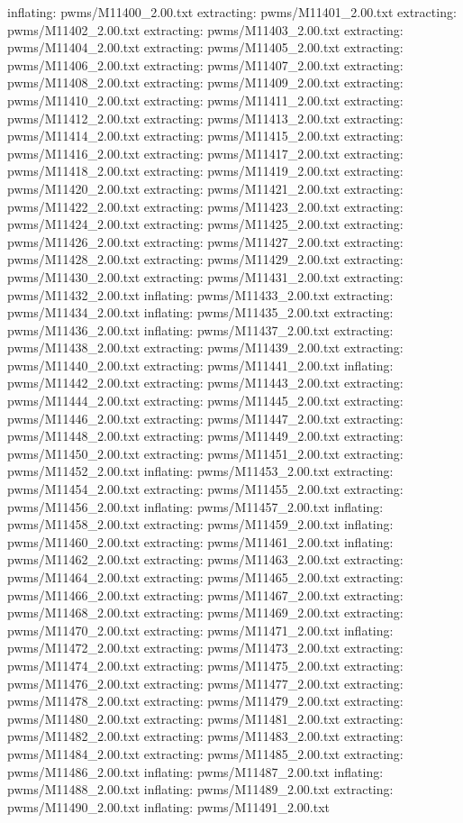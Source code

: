 \documentclass[letterpaper,10pt,english]{sphinxmanual}
\begin{document}
{\begin{sphinxVerbatim}[commandchars=\\\{\}]
  inflating: pwms/M11400\_2.00.txt
 extracting: pwms/M11401\_2.00.txt
 extracting: pwms/M11402\_2.00.txt
 extracting: pwms/M11403\_2.00.txt
 extracting: pwms/M11404\_2.00.txt
 extracting: pwms/M11405\_2.00.txt
 extracting: pwms/M11406\_2.00.txt
 extracting: pwms/M11407\_2.00.txt
 extracting: pwms/M11408\_2.00.txt
 extracting: pwms/M11409\_2.00.txt
 extracting: pwms/M11410\_2.00.txt
 extracting: pwms/M11411\_2.00.txt
 extracting: pwms/M11412\_2.00.txt
 extracting: pwms/M11413\_2.00.txt
 extracting: pwms/M11414\_2.00.txt
 extracting: pwms/M11415\_2.00.txt
 extracting: pwms/M11416\_2.00.txt
 extracting: pwms/M11417\_2.00.txt
 extracting: pwms/M11418\_2.00.txt
 extracting: pwms/M11419\_2.00.txt
 extracting: pwms/M11420\_2.00.txt
 extracting: pwms/M11421\_2.00.txt
 extracting: pwms/M11422\_2.00.txt
 extracting: pwms/M11423\_2.00.txt
 extracting: pwms/M11424\_2.00.txt
 extracting: pwms/M11425\_2.00.txt
 extracting: pwms/M11426\_2.00.txt
 extracting: pwms/M11427\_2.00.txt
 extracting: pwms/M11428\_2.00.txt
 extracting: pwms/M11429\_2.00.txt
 extracting: pwms/M11430\_2.00.txt
 extracting: pwms/M11431\_2.00.txt
 extracting: pwms/M11432\_2.00.txt
  inflating: pwms/M11433\_2.00.txt
 extracting: pwms/M11434\_2.00.txt
  inflating: pwms/M11435\_2.00.txt
 extracting: pwms/M11436\_2.00.txt
  inflating: pwms/M11437\_2.00.txt
 extracting: pwms/M11438\_2.00.txt
 extracting: pwms/M11439\_2.00.txt
 extracting: pwms/M11440\_2.00.txt
 extracting: pwms/M11441\_2.00.txt
  inflating: pwms/M11442\_2.00.txt
 extracting: pwms/M11443\_2.00.txt
 extracting: pwms/M11444\_2.00.txt
 extracting: pwms/M11445\_2.00.txt
 extracting: pwms/M11446\_2.00.txt
 extracting: pwms/M11447\_2.00.txt
 extracting: pwms/M11448\_2.00.txt
 extracting: pwms/M11449\_2.00.txt
 extracting: pwms/M11450\_2.00.txt
 extracting: pwms/M11451\_2.00.txt
 extracting: pwms/M11452\_2.00.txt
  inflating: pwms/M11453\_2.00.txt
 extracting: pwms/M11454\_2.00.txt
 extracting: pwms/M11455\_2.00.txt
 extracting: pwms/M11456\_2.00.txt
  inflating: pwms/M11457\_2.00.txt
  inflating: pwms/M11458\_2.00.txt
 extracting: pwms/M11459\_2.00.txt
  inflating: pwms/M11460\_2.00.txt
 extracting: pwms/M11461\_2.00.txt
  inflating: pwms/M11462\_2.00.txt
 extracting: pwms/M11463\_2.00.txt
 extracting: pwms/M11464\_2.00.txt
 extracting: pwms/M11465\_2.00.txt
 extracting: pwms/M11466\_2.00.txt
 extracting: pwms/M11467\_2.00.txt
 extracting: pwms/M11468\_2.00.txt
 extracting: pwms/M11469\_2.00.txt
 extracting: pwms/M11470\_2.00.txt
 extracting: pwms/M11471\_2.00.txt
  inflating: pwms/M11472\_2.00.txt
 extracting: pwms/M11473\_2.00.txt
 extracting: pwms/M11474\_2.00.txt
 extracting: pwms/M11475\_2.00.txt
 extracting: pwms/M11476\_2.00.txt
 extracting: pwms/M11477\_2.00.txt
 extracting: pwms/M11478\_2.00.txt
 extracting: pwms/M11479\_2.00.txt
 extracting: pwms/M11480\_2.00.txt
 extracting: pwms/M11481\_2.00.txt
 extracting: pwms/M11482\_2.00.txt
 extracting: pwms/M11483\_2.00.txt
 extracting: pwms/M11484\_2.00.txt
 extracting: pwms/M11485\_2.00.txt
 extracting: pwms/M11486\_2.00.txt
  inflating: pwms/M11487\_2.00.txt
  inflating: pwms/M11488\_2.00.txt
  inflating: pwms/M11489\_2.00.txt
 extracting: pwms/M11490\_2.00.txt
  inflating: pwms/M11491\_2.00.txt
\end{sphinxVerbatim}
}
\end{document}

